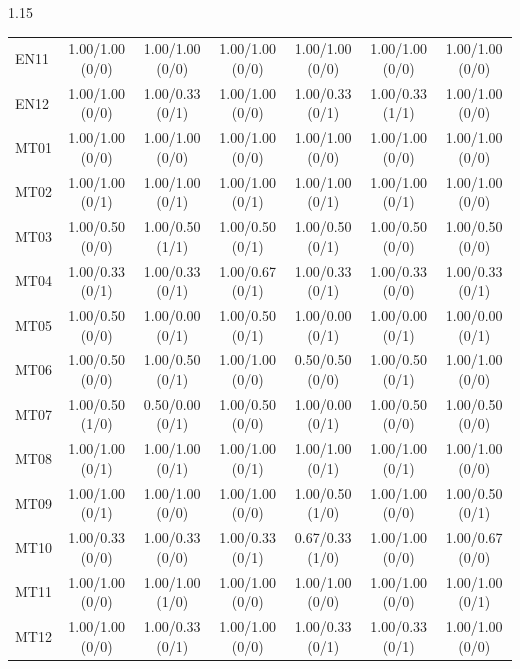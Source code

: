 \begin{spacing}{1.15}
\begin{longtable}{@{}lcccccc@{}}
EN11 & 1.00/1.00 (0/0) & 1.00/1.00 (0/0) & 1.00/1.00 (0/0) & 1.00/1.00 (0/0) & 1.00/1.00 (0/0) & 1.00/1.00 (0/0) \\
EN12 & 1.00/1.00 (0/0) & 1.00/0.33 (0/1) & 1.00/1.00 (0/0) & 1.00/0.33 (0/1) & 1.00/0.33 (1/1) & 1.00/1.00 (0/0) \\
MT01 & 1.00/1.00 (0/0) & 1.00/1.00 (0/0) & 1.00/1.00 (0/0) & 1.00/1.00 (0/0) & 1.00/1.00 (0/0) & 1.00/1.00 (0/0) \\
MT02 & 1.00/1.00 (0/1) & 1.00/1.00 (0/1) & 1.00/1.00 (0/1) & 1.00/1.00 (0/1) & 1.00/1.00 (0/1) & 1.00/1.00 (0/0) \\
MT03 & 1.00/0.50 (0/0) & 1.00/0.50 (1/1) & 1.00/0.50 (0/1) & 1.00/0.50 (0/1) & 1.00/0.50 (0/0) & 1.00/0.50 (0/0) \\
MT04 & 1.00/0.33 (0/1) & 1.00/0.33 (0/1) & 1.00/0.67 (0/1) & 1.00/0.33 (0/1) & 1.00/0.33 (0/0) & 1.00/0.33 (0/1) \\
MT05 & 1.00/0.50 (0/0) & 1.00/0.00 (0/1) & 1.00/0.50 (0/1) & 1.00/0.00 (0/1) & 1.00/0.00 (0/1) & 1.00/0.00 (0/1) \\
MT06 & 1.00/0.50 (0/0) & 1.00/0.50 (0/1) & 1.00/1.00 (0/0) & 0.50/0.50 (0/0) & 1.00/0.50 (0/1) & 1.00/1.00 (0/0) \\
MT07 & 1.00/0.50 (1/0) & 0.50/0.00 (0/1) & 1.00/0.50 (0/0) & 1.00/0.00 (0/1) & 1.00/0.50 (0/0) & 1.00/0.50 (0/0) \\
MT08 & 1.00/1.00 (0/1) & 1.00/1.00 (0/1) & 1.00/1.00 (0/1) & 1.00/1.00 (0/1) & 1.00/1.00 (0/1) & 1.00/1.00 (0/0) \\
MT09 & 1.00/1.00 (0/1) & 1.00/1.00 (0/0) & 1.00/1.00 (0/0) & 1.00/0.50 (1/0) & 1.00/1.00 (0/0) & 1.00/0.50 (0/1) \\
MT10 & 1.00/0.33 (0/0) & 1.00/0.33 (0/0) & 1.00/0.33 (0/1) & 0.67/0.33 (1/0) & 1.00/1.00 (0/0) & 1.00/0.67 (0/0) \\
MT11 & 1.00/1.00 (0/0) & 1.00/1.00 (1/0) & 1.00/1.00 (0/0) & 1.00/1.00 (0/0) & 1.00/1.00 (0/0) & 1.00/1.00 (0/1) \\
MT12 & 1.00/1.00 (0/0) & 1.00/0.33 (0/1) & 1.00/1.00 (0/0) & 1.00/0.33 (0/1) & 1.00/0.33 (0/1) & 1.00/1.00 (0/0) \\
\end{longtable}
\end{spacing}
